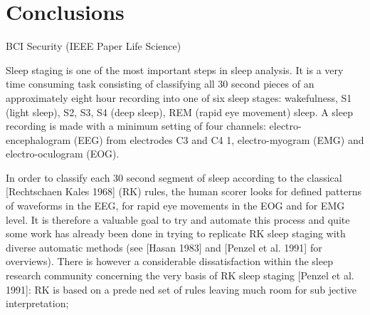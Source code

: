 \chapter{Conclusions}

BCI Security (IEEE Paper Life Science)



Sleep staging is one of the most important steps in sleep analysis. It is
a very time consuming task consisting of classifying all 30 second pieces
of an approximately eight hour recording into one of six sleep stages:
wakefulness, S1 (light sleep), S2, S3, S4 (deep sleep), REM (rapid eye
movement) sleep. A sleep recording is made with a minimum setting
of four channels: electro-encephalogram (EEG) from electrodes C3 and
C4 1, electro-myogram (EMG) and electro-oculogram (EOG). 

In order
to classify each 30 second segment of sleep according to the classical
[Rechtschaen  Kales 1968] (RK) rules, the human scorer looks for
defined patterns of waveforms in the EEG, for rapid eye movements in
the EOG and for EMG level. It is therefore a valuable goal to try and
automate this process and quite some work has already been done in
trying to replicate RK sleep staging with diverse automatic methods (see
[Hasan 1983] and [Penzel et al. 1991] for overviews). There is however a
considerable dissatisfaction within the sleep research community concerning
the very basis of RK sleep staging [Penzel et al. 1991]: RK is based on
a predened set of rules leaving much room for sub jective interpretation;